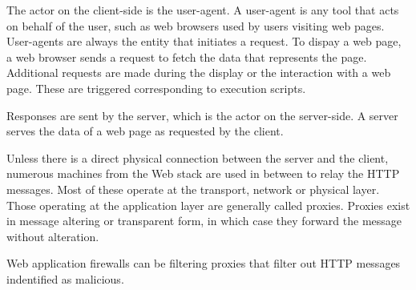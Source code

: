 The actor on the client-side is the user-agent.
A user-agent is any tool that acts on behalf of the user, such as web browsers used by users visiting web pages.
User-agents are always the entity that initiates a request.
To dispay a web page, a web browser sends a request to fetch the data that represents the page.
Additional requests are made during the display or the interaction with a web page.
These are triggered corresponding to execution scripts.

Responses are sent by the server, which is the actor on the server-side.
A server serves the data of a web page as requested by the client.

Unless there is a direct physical connection between the server and the client, numerous machines from the Web stack are used in between to relay the HTTP messages.
Most of these operate at the transport, network or physical layer.
Those operating at the application layer are generally called proxies.
Proxies exist in message altering or transparent form, in which case they forward the message without alteration. \cite{mdn/http}

Web application firewalls can be filtering proxies that filter out HTTP messages indentified as malicious.



